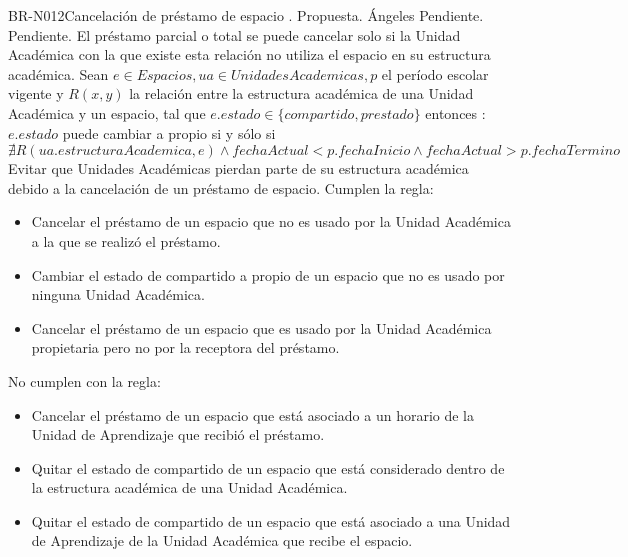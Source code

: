 \begin{BusinessRule}{BR-N012}{Cancelación de préstamo de espacio}
	{\bcCondition}    %
	{\btEnabler}     %
	{\blControlling}    %
	.
	\BRItem[Estado] Propuesta.
	 Ángeles
	 Pendiente.
	 Pendiente.
	\BRItem[Descripción] El préstamo parcial o total se puede cancelar solo si la Unidad Académica con la que existe esta relación no utiliza el espacio en su estructura académica.
	\BRItem[Sentencia] Sean $ e \in Espacios, ua \in UnidadesAcademicas, p$ el período escolar vigente y $R(x,y) $ la relación entre la estructura académica de una Unidad Académica y un espacio, tal que $ e.estado \in \{compartido, prestado \}  $ entonces :\\
		$ e.estado $ puede cambiar a propio si y sólo si $ \nexists R(ua.estructuraAcademica, e) \land fechaActual < p.fechaInicio \land fechaActual > p.fechaTermino $
	\BRItem[Motivación] Evitar que Unidades Académicas pierdan parte de su estructura académica debido a la cancelación de un préstamo de espacio.
	 Cumplen la regla:
		\begin{itemize}
			\item Cancelar el préstamo de un espacio que no es usado por la Unidad Académica a la que se realizó el préstamo.
			\item Cambiar el estado de compartido a propio de un espacio que no es usado por ninguna Unidad Académica.
			\item Cancelar el préstamo de un espacio que es usado por la Unidad Académica propietaria pero no por la receptora del préstamo.
		\end{itemize}
	 No cumplen con la regla:
		\begin{itemize}
			\item Cancelar el préstamo de un espacio que está asociado a un horario de la Unidad de Aprendizaje que recibió el préstamo.
			\item Quitar el estado de compartido de un espacio que está considerado dentro de la estructura académica de una Unidad Académica.
			\item Quitar el estado de compartido de un espacio que está asociado a una Unidad de Aprendizaje de la Unidad Académica que recibe el espacio.
		\end{itemize}
\end{BusinessRule}


